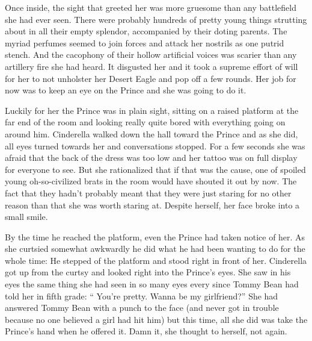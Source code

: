 \documentclass[11pt,letterpaper]{article}
\begin{document}
Once inside, the sight that greeted her was more gruesome than any battlefield she had ever seen. There were probably hundreds of pretty young things strutting about in all their empty splendor, accompanied by their doting parents. The myriad perfumes seemed to join forces and attack her nostrils as one putrid stench. And the cacophony of their hollow artificial voices was scarier than any artillery fire she had heard. It disgusted her and it took a supreme effort of will for her to not unholster her Desert Eagle and pop off a few rounds. Her job for now was to keep an eye on the Prince and she was going to do it.

Luckily for her the Prince was in plain sight, sitting on a raised platform at the far end of the room and looking really quite bored with everything going on around him. Cinderella walked down the hall toward the Prince and as she did, all eyes turned towards her and conversations stopped. For a few seconds she was afraid that the back of the dress was too low and her tattoo was on full display for everyone to see. But she rationalized that if that was the cause, one of spoiled young oh-so-civilized brats in the room would have shouted it out by now. The fact that they hadn't probably meant that they were just staring for no other reason than that she was worth staring at. Despite herself, her face broke into a small smile.

By the time he reached the platform, even the Prince had taken notice of her. As she curtsied somewhat awkwardly he did what he had been wanting to do for the whole time: He stepped of the platform and stood right in front of her. Cinderella got up from the curtsy and looked right into the Prince's eyes. She saw in his eyes the same thing she had seen in so many eyes every since Tommy Bean had told her in fifth grade: `` You're pretty. Wanna be my girlfriend?'' She had answered Tommy Bean with a punch to the face (and never got in trouble because no one believed a girl had hit him) but this time, all she did was take the Prince's hand when he offered it. Damn it, she thought to herself, not again.
\end{document}
